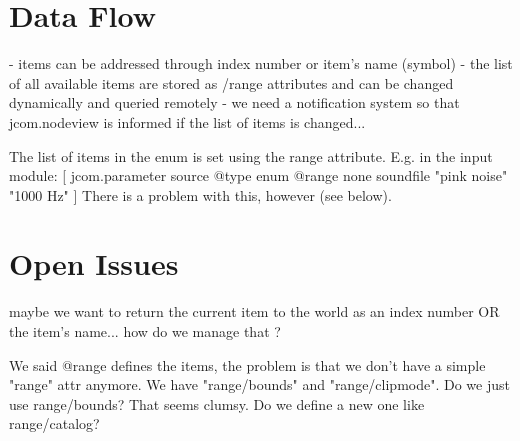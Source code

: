 \documentclass[]{article}
\begin{document}

\section{Data Flow}

- items can be addressed through index number or item's name (symbol)
- the list of all available items are stored as /range attributes and can be changed dynamically and queried remotely
- we need a notification system so that jcom.nodeview is informed if the list of items is changed... 

The list of items in the enum is set using the range attribute. E.g. in the input module:
	[ jcom.parameter source @type enum @range none soundfile "pink noise" "1000 Hz" ]
There is a problem with this, however (see below).



\section{Open Issues}

maybe we want to return the current item to the world as an index number OR the item's name... how do we manage that ?

We said @range defines the items, the problem is that we don't have a simple "range" attr anymore.  We have "range/bounds" and "range/clipmode".  Do we just use range/bounds?  That seems clumsy.  Do we define a new one like range/catalog?






\end{document}
